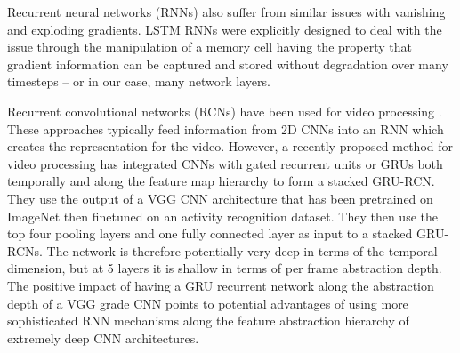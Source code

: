 \documentclass{article}
\begin{document}
Recurrent neural networks (RNNs) also suffer from similar issues with vanishing and exploding gradients. LSTM RNNs were explicitly designed to deal with the issue through the manipulation of a memory cell having the property that gradient information can be captured and stored without degradation over many timesteps -- or in our case, many network layers. 

Recurrent convolutional networks (RCNs) have been used for video processing \cite{srivastava2015unsupervised,donahue2014long}. These approaches typically feed information from 2D CNNs into an RNN which creates the representation for the video. 
%
However, a recently proposed method for video processing \cite{ballas2015delving} has integrated CNNs with gated recurrent units or GRUs \cite{chung2014empirical} both temporally and along the feature map hierarchy to form a stacked GRU-RCN. They use the output of a VGG CNN architecture that has been pretrained on ImageNet \cite{simonyan2014very} then finetuned on an activity recognition dataset. They then use the top four pooling layers and one fully connected layer as input to a stacked GRU-RCNs. The network is therefore potentially very deep in terms of the temporal dimension, but at 5 layers it is shallow in terms of per frame abstraction depth. The positive impact of having a GRU recurrent network along the abstraction depth of a VGG grade CNN points to potential advantages of using more sophisticated RNN mechanisms along the feature abstraction hierarchy of extremely deep CNN architectures.
\end{document}
